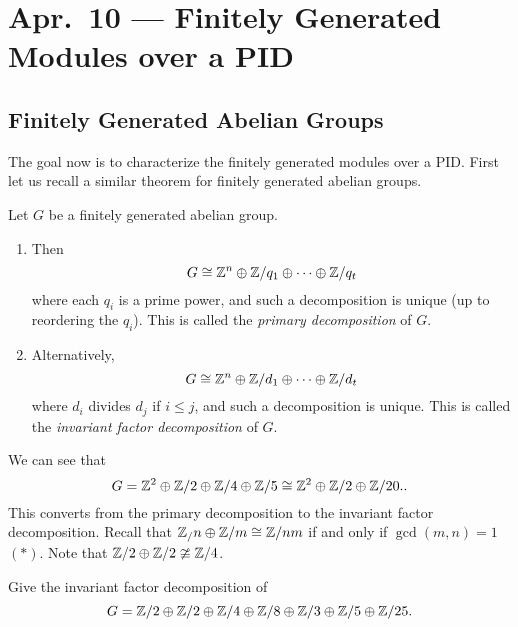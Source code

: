 \chapter{Apr.~10 --- Finitely Generated Modules over a PID}

\section{Finitely Generated Abelian Groups}
\begin{remark}
The goal now is to characterize the finitely generated
modules over a PID. First let us recall a similar theorem
for finitely generated abelian groups.
\end{remark}

\begin{theorem}
  \label{thm:finite-gen-groups}
  Let $G$ be a finitely generated abelian group.
  \begin{enumerate}
    \item Then
      \[
        G \cong \mathbb{Z}^n \oplus \mathbb{Z} / q_1 \oplus \dots \oplus \mathbb{Z} / q_t
      \]
      where each $q_i$ is a prime power, and such a
      decomposition is unique (up to reordering
      the $q_i$). This is called the \emph{primary
      decomposition} of $G$.
    \item Alternatively,
      \[
        G \cong \mathbb{Z}^n \oplus \mathbb{Z} / d_1 \oplus \dots \oplus \mathbb{Z} / d_t
      \]
      where $d_i$ divides $d_j$ if $i \le j$, and
      such a decomposition is unique. This is called
      the \emph{invariant factor decomposition} of $G$.
  \end{enumerate}
\end{theorem}

\begin{example}
  We can see that
  \[G = \mathbb{Z}^2 \oplus \mathbb{Z} / 2 \oplus \mathbb{Z} / 4 \oplus \mathbb{Z} / 5 \cong \mathbb{Z}^2 \oplus \mathbb{Z} / 2 \oplus \mathbb{Z} / 20..\]
  This converts from the primary decomposition to the invariant factor decomposition.
  Recall that $\mathbb{Z}_ / n \oplus \mathbb{Z} / m \cong \mathbb{Z} / nm$
  if and only if $\gcd(m, n) = 1$ $(*)$. Note that
  $\mathbb{Z} / 2 \oplus \mathbb{Z} / 2 \ncong \mathbb{Z} / 4$.
\end{example}

\begin{exercise}
  Give the invariant factor decomposition of
  \[
    G = \mathbb{Z} / 2 \oplus \mathbb{Z} / 2 \oplus \mathbb{Z} / 4 \oplus \mathbb{Z} / 8 \oplus \mathbb{Z} / 3 \oplus \mathbb{Z} / 5 \oplus \mathbb{Z} / 25.
  \]
\end{exercise}

